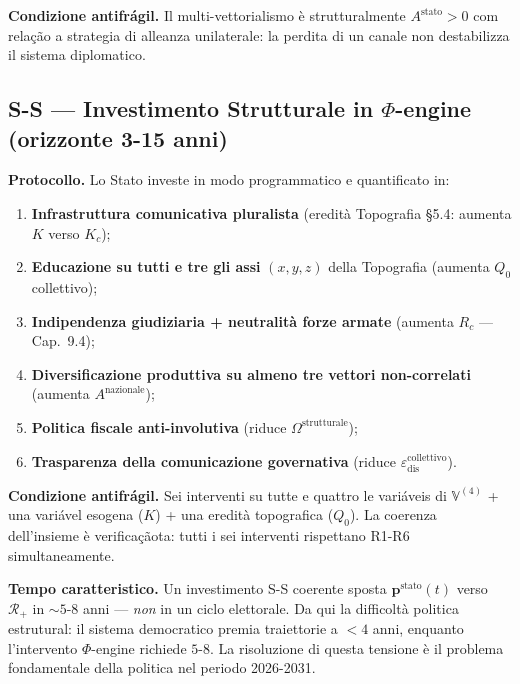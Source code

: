 \Proved{} \textbf{Condizione antifrágil.} Il multi-vettorialismo è
strutturalmente \(A^{\text{stato}} > 0\) com relação a strategia di
alleanza unilaterale: la perdita di un canale non destabilizza il
sistema diplomatico.

\subsection{\texorpdfstring{S-S --- Investimento Strutturale in
\(\Phi\)-engine (orizzonte 3-15
anni)}{S-S --- Investimento Strutturale in \textbackslash Phi-engine (orizzonte 3-15 anni)}}\label{s-s-investimento-estrutural-in-phi-engine-orizzonte-3-15-anni}

\Hypoth{} \textbf{Protocollo.} Lo Stato investe in modo programmatico e
quantificato in:

\begin{enumerate}
\def\labelenumi{\arabic{enumi}.}
\tightlist
\item
  \textbf{Infrastruttura comunicativa pluralista} (eredità Topografia
  \S{}5.4: aumenta \(K\) verso \(K_c\));
\item
  \textbf{Educazione su tutti e tre gli assi} \((x, y, z)\) della
  Topografia (aumenta \(Q_0\) collettivo);
\item
  \textbf{Indipendenza giudiziaria + neutralità forze armate} (aumenta
  \(R_c\) --- Cap.~9.4);
\item
  \textbf{Diversificazione produttiva su almeno tre vettori
  non-correlati} (aumenta \(A^{\text{nazionale}}\));
\item
  \textbf{Politica fiscale anti-involutiva} (riduce
  \(\Omega^{\text{strutturale}}\));
\item
  \textbf{Trasparenza della comunicazione governativa} (riduce
  \(\varepsilon_{\text{dis}}^{\text{collettivo}}\)).
\end{enumerate}

\Proved{} \textbf{Condizione antifrágil.} Sei interventi su tutte e
quattro le variáveis di \(\mathbb{V}^{(4)}\) + una variável esogena
(\(K\)) + una eredità topografica (\(Q_0\)). La coerenza dell'insieme è
verificaçãota: tutti i sei interventi rispettano R1-R6 simultaneamente.

\Hypoth{} \textbf{Tempo caratteristico.} Un investimento S-S coerente
sposta \(\boldsymbol{p}^{\text{stato}}(t)\) verso \(\mathcal{R}_+\) in
\(\sim 5\)-\(8\) anni --- \emph{non} in un ciclo elettorale. Da qui la
difficoltà politica estrutural: il sistema democratico premia
traiettorie a \(< 4\) anni, enquanto l'intervento \(\Phi\)-engine richiede
\(5\)-\(8\). La risoluzione di questa tensione è il problema
fondamentale della politica nel periodo 2026-2031.



